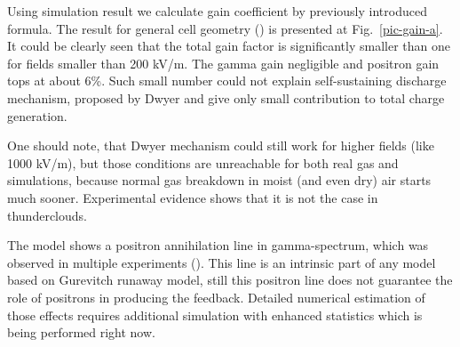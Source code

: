 \documentclass[utf8]{webofc}
\begin{document}
    Using simulation result we calculate gain coefficient by previously introduced formula. The result for general cell geometry () is presented at Fig.~\ref{pic-gain-a}. It could be clearly seen that the total gain factor is significantly smaller than one for fields smaller than 200 kV/m. The gamma gain negligible and positron gain tops at about 6\%. Such small number could not explain self-sustaining discharge mechanism, proposed by Dwyer and give only small contribution to total charge generation.
    
    One should note, that Dwyer mechanism could still work for higher fields (like 1000 kV/m), but those conditions are unreachable for both real gas and simulations, because normal gas breakdown in moist (and even dry) air starts much sooner. Experimental evidence shows that it is not the case in thunderclouds.
    
    The model shows a positron annihilation line in gamma-spectrum, which was observed in multiple experiments (). This line is an intrinsic part of any model based on Gurevitch runaway model, still this positron line does not guarantee the role of positrons in producing the feedback. Detailed numerical estimation of those effects requires additional simulation with enhanced statistics which is being performed right now.
    
    
\end{document}
